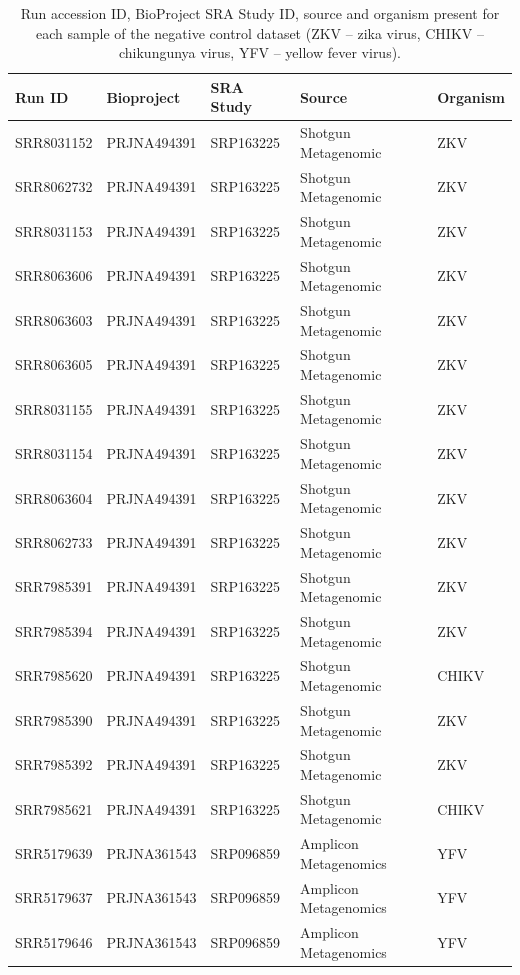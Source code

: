 \begin{longtable}{@{}lllll@{}}
\caption{Run accession ID, BioProject SRA Study ID, source and organism present for each sample of the negative control dataset (ZKV – zika virus, CHIKV – chikungunya virus, YFV – yellow fever virus).}
\label{tab:chap4_s2}\\
\toprule
Run ID     & Bioproject  & SRA Study & Source                & Organism \\ \midrule
SRR8031152 & PRJNA494391 & SRP163225 & Shotgun Metagenomic   & ZKV      \\
SRR8062732 & PRJNA494391 & SRP163225 & Shotgun Metagenomic   & ZKV      \\
SRR8031153 & PRJNA494391 & SRP163225 & Shotgun Metagenomic   & ZKV      \\
SRR8063606 & PRJNA494391 & SRP163225 & Shotgun Metagenomic   & ZKV      \\
SRR8063603 & PRJNA494391 & SRP163225 & Shotgun Metagenomic   & ZKV      \\
SRR8063605 & PRJNA494391 & SRP163225 & Shotgun Metagenomic   & ZKV      \\
SRR8031155 & PRJNA494391 & SRP163225 & Shotgun Metagenomic   & ZKV      \\
SRR8031154 & PRJNA494391 & SRP163225 & Shotgun Metagenomic   & ZKV      \\
SRR8063604 & PRJNA494391 & SRP163225 & Shotgun Metagenomic   & ZKV      \\
SRR8062733 & PRJNA494391 & SRP163225 & Shotgun Metagenomic   & ZKV      \\
SRR7985391 & PRJNA494391 & SRP163225 & Shotgun Metagenomic   & ZKV      \\
SRR7985394 & PRJNA494391 & SRP163225 & Shotgun Metagenomic   & ZKV      \\
SRR7985620 & PRJNA494391 & SRP163225 & Shotgun Metagenomic   & CHIKV    \\
SRR7985390 & PRJNA494391 & SRP163225 & Shotgun Metagenomic   & ZKV      \\
SRR7985392 & PRJNA494391 & SRP163225 & Shotgun Metagenomic   & ZKV      \\
SRR7985621 & PRJNA494391 & SRP163225 & Shotgun Metagenomic   & CHIKV    \\
SRR5179639 & PRJNA361543 & SRP096859 & Amplicon Metagenomics & YFV      \\
SRR5179637 & PRJNA361543 & SRP096859 & Amplicon Metagenomics & YFV      \\
SRR5179646 & PRJNA361543 & SRP096859 & Amplicon Metagenomics & YFV      \\

\end{longtable}
